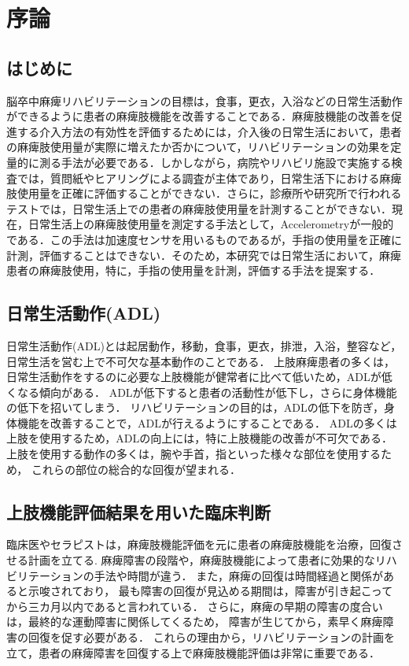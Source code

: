 \chapter{序論}

\section{はじめに}
脳卒中麻痺リハビリテーションの目標は，食事，更衣，入浴などの日常生活動作ができるように患者の麻痺肢機能を改善することである．麻痺肢機能の改善を促進する介入方法の有効性を評価するためには，介入後の日常生活において，患者の麻痺肢使用量が実際に増えたか否かについて，リハビリテーションの効果を定量的に測る手法が必要である．しかしながら，病院やリハビリ施設で実施する検査では，質問紙やヒアリングによる調査が主体であり，日常生活下における麻痺肢使用量を正確に評価することができない\cite{Taub2006,Rand2009}．さらに，診療所や研究所で行われるテストでは，日常生活上での患者の麻痺肢使用量を計測することができない．現在，日常生活上の麻痺肢使用量を測定する手法として，Accelerometryが一般的である．この手法は加速度センサを用いるものであるが，手指の使用量を正確に計測，評価することはできない．そのため，本研究では日常生活において，麻痺患者の麻痺肢使用，特に，手指の使用量を計測，評価する手法を提案する．

\section{日常生活動作(ADL)}
日常生活動作(ADL)とは起居動作，移動，食事，更衣，排泄，入浴，整容など，日常生活を営む上で不可欠な基本動作のことである．
上肢麻痺患者の多くは，日常生活動作をするのに必要な上肢機能が健常者に比べて低いため，ADLが低くなる傾向がある\cite{Zeiler2017}．
ADLが低下すると患者の活動性が低下し，さらに身体機能の低下を招いてしまう\cite{Mlinac2016}．
リハビリテーションの目的は，ADLの低下を防ぎ，身体機能を改善することで，ADLが行えるようにすることである．
ADLの多くは上肢を使用するため，ADLの向上には，特に上肢機能の改善が不可欠である．
上肢を使用する動作の多くは，腕や手首，指といった様々な部位を使用するため，
これらの部位の総合的な回復が望まれる．

\section{上肢機能評価結果を用いた臨床判断}
臨床医やセラピストは，麻痺肢機能評価を元に患者の麻痺肢機能を治療，回復させる計画を立てる.
麻痺障害の段階や，麻痺肢機能によって患者に効果的なリハビリテーションの手法や時間が違う．
また，麻痺の回復は時間経過と関係があると示唆されており，
最も障害の回復が見込める期間は，障害が引き起こってから三カ月以内であると言われている．
さらに，麻痺の早期の障害の度合いは，最終的な運動障害に関係してくるため，
障害が生じてから，素早く麻痺障害の回復を促す必要がある\cite{Langhorne2011}．
これらの理由から，リハビリテーションの計画を立て，患者の麻痺障害を回復する上で麻痺肢機能評価は非常に重要である\cite{Lang2013}．

